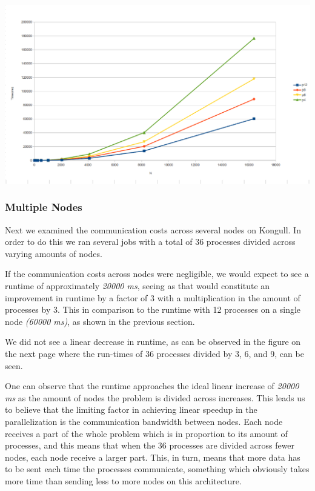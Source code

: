 \documentclass[fontsize=11pt,paper=a4,titlepage]{article}
\begin{document}
\hspace*{-3.3cm}\includegraphics[scale=0.6]{pics/pX.png}

\subsubsection{Multiple Nodes}

Next we examined the communication costs across several nodes on Kongull. In
order to do this we ran several jobs with a total of 36 processes divided across
varying amounts of nodes.

If the communication costs across nodes were negligible, we would expect to see
a runtime of approximately \emph{20000 ms}, seeing as that would constitute an
improvement in runtime by a factor of 3 with a multiplication in the amount of
processes by 3. This in comparison to the runtime with 12 processes on a single
node \emph{(60000 ms)}, as shown in the previous section.

We did not see a linear decrease in runtime, as can be observed in the figure
on the next page where the run-times of 36 processes divided by 3, 6, and 9, can
be seen.

One can observe that the runtime approaches the ideal linear increase of
\emph{20000 ms} as the amount of nodes the problem is divided across increases.
This leads us to believe that the limiting factor in achieving linear speedup in
the parallelization is the communication bandwidth between nodes. Each node
receives a part of the whole problem which is in proportion to its amount of
processes, and this means that when the 36 processes are divided across fewer
nodes, each node receive a larger part. This, in turn, means that more data has
to be sent each time the processes communicate, something which obviously takes
more time than sending less to more nodes on this architecture.
\end{document}
